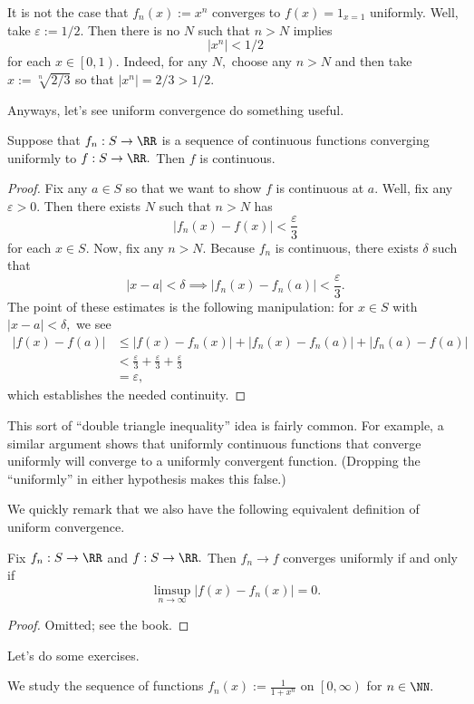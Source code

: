 \documentclass[../notes.tex]{subfiles}
\begin{document}
\begin{nex}
	It is not the case that $f_n(x):=x^n$ converges to $f(x)=1_{x=1}$ uniformly. Well, take $\varepsilon:=1/2.$ Then there is no $N$ such that $n>N$ implies
	\[\left|x^n\right|<1/2\]
	for each $x\in\left[0,1\right).$ Indeed, for any $N,$ choose any $n>N$ and then take $x:=\sqrt[n]{2/3}$ so that $|x^n|=2/3>1/2.$
\end{nex}
Anyways, let's see uniform convergence do something useful.
\begin{proposition}
	Suppose that $f_n:S\to\RR$ is a sequence of continuous functions converging uniformly to $f:S\to\RR.$ Then $f$ is continuous.
\end{proposition}
\begin{proof}
	Fix any $a\in S$ so that we want to show $f$ is continuous at $a.$ Well, fix any $\varepsilon>0.$ Then there exists $N$ such that $n>N$ has
	\[|f_n(x)-f(x)|<\frac\varepsilon3\]
	for each $x\in S.$ Now, fix any $n>N.$ Because $f_n$ is continuous, there exists $\delta$ such that
	\[|x-a|<\delta\implies|f_n(x)-f_n(a)|<\frac\varepsilon3.\]
	The point of these estimates is the following manipulation: for $x\in S$ with $|x-a|<\delta,$ we see
	\begin{align*}
		|f(x)-f(a)| &\le |f(x)-f_n(x)|+|f_n(x)-f_n(a)|+|f_n(a)-f(a)| \\
		&< \frac\varepsilon3+\frac\varepsilon3+\frac\varepsilon3 \\
		&=\varepsilon,
	\end{align*}
	which establishes the needed continuity.
\end{proof}
\begin{remark}
	This sort of ``double triangle inequality'' idea is fairly common. For example, a similar argument shows that uniformly continuous functions that converge uniformly will converge to a uniformly convergent function. (Dropping the ``uniformly'' in either hypothesis makes this false.)
\end{remark}
We quickly remark that we also have the following equivalent definition of uniform convergence.
\begin{proposition}
	Fix $f_n:S\to\RR$ and $f:S\to\RR.$ Then $f_n\to f$ converges uniformly if and only if
	\[\limsup_{n\to\infty}|f(x)-f_n(x)|=0.\]
\end{proposition}
\begin{proof}
	Omitted; see the book.
\end{proof}
Let's do some exercises.
\begin{exercise}
	We study the sequence of functions $f_n(x):=\frac1{1+x^n}$ on $\left[0,\infty\right)$ for $n\in\NN.$
\end{exercise}
\end{document}
